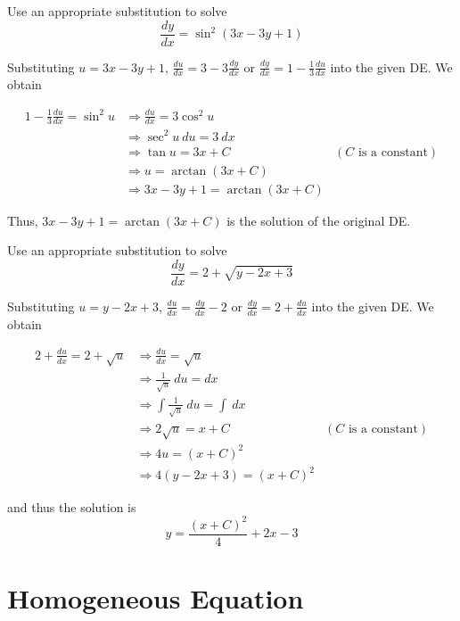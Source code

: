 \begin{example}
    Use an appropriate substitution to solve 
    \[
        \frac{dy}{dx} = \sin^2(3x-3y+1)
    \]
\end{example}
\begin{solution}
    Substituting $u = 3x - 3y +1$, $\frac{du}{dx} = 3 - 3\frac{dy}{dx}$ 
    or $\frac{dy}{dx} = 1 - \frac{1}{3} \frac{du}{dx}$ into the given DE. We obtain 

    \begin{align*}
        1 - \frac{1}{3} \frac{du}{dx} = \sin^2 u &\Rightarrow \frac{du}{dx} = 3 \cos^2 u\\
        &\Rightarrow \sec^2 u \>du = 3\>dx\\
        &\Rightarrow \tan u = 3x + C & (C \text{ is a constant})\\
        &\Rightarrow u = \arctan(3x + C)\\
        &\Rightarrow 3x - 3y +1 = \arctan(3x + C)
    \end{align*}
\end{solution}

Thus, $3x - 3y +1 = \arctan(3x + C)$ is the solution of the original DE.

\begin{example}
    Use an appropriate substitution to solve 
    \[
        \frac{dy}{dx} = 2 + \sqrt{y - 2x + 3}
    \]
\end{example}
\begin{solution}
    Substituting $u = y - 2x + 3$, $\frac{du}{dx} = \frac{dy}{dx} - 2$ 
    or $\frac{dy}{dx} = 2 + \frac{du}{dx}$ into the given DE. We obtain 

    \begin{align*}
        2 + \frac{du}{dx} = 2 + \sqrt{u} &\Rightarrow \frac{du}{dx} = \sqrt{u}\\
        &\Rightarrow \frac{1}{\sqrt{u}} \>du = dx\\
        &\Rightarrow \int \frac{1}{\sqrt{u}} \>du = \int \> dx\\
        &\Rightarrow 2 \sqrt{u} = x + C & (C \text{ is a constant})\\
        &\Rightarrow 4u = (x + C)^2\\
        &\Rightarrow 4(y - 2x + 3) = (x + C)^2
    \end{align*}

    and thus the solution is 
    \[
        y = \frac{(x + C)^2}{4} + 2x - 3
    \]
\end{solution}

\section{Homogeneous Equation}


